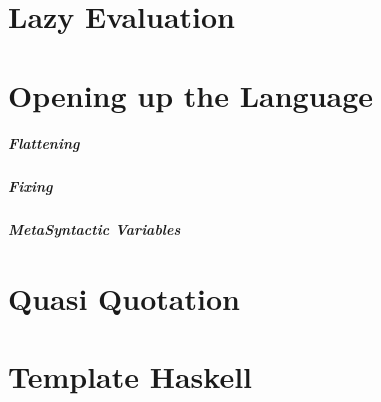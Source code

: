\documentclass[thesis-solanki.tex]{subfiles}
\begin{document}
\section{Lazy Evaluation}







\section{Opening up the Language}

\subparagraph{Flattening}

\subparagraph{Fixing}

\subparagraph{MetaSyntactic Variables}






\section{Quasi Quotation}







\section{Template Haskell}



\end{document}
